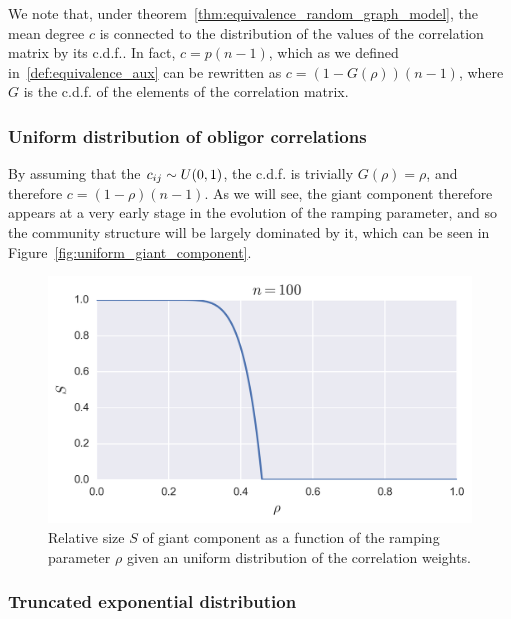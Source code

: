 We note that, under theorem~\ref{thm:equivalence_random_graph_model}, the mean degree $c$ is connected to the distribution of the values of the correlation matrix by its c.d.f..
In fact, $c = p (n-1)$, which as we defined in~\ref{def:equivalence_aux} can be rewritten as $c = (1-G(\rho)) (n-1)$, where $G$ is the c.d.f. of the elements of the correlation matrix.


\subsubsection{Uniform distribution of obligor correlations} %
\label{ssub:uniform_distribution}

By assuming that the $c_{ij} \sim  U(0,1)$, the c.d.f. is trivially $G(\rho) = \rho$, and therefore $c = (1 -\rho)(n-1)$.
As we will see, the giant component therefore appears at a very early stage in the evolution of the ramping parameter, and so the community structure will be largely dominated by it, which can be seen in Figure~\vref{fig:uniform_giant_component}.
\begin{figure}[tb]
	\centering
	\includegraphics[scale=.8]{figures/3_uniform_giant_component.png}
	\caption{Relative size $S$ of giant component as a function of the ramping parameter $\rho$ given an uniform distribution of the correlation weights.}
	\label{fig:uniform_giant_component}
\end{figure}


\subsubsection{Truncated exponential distribution} %
\label{ssub:truncated_exponential_distribution}


